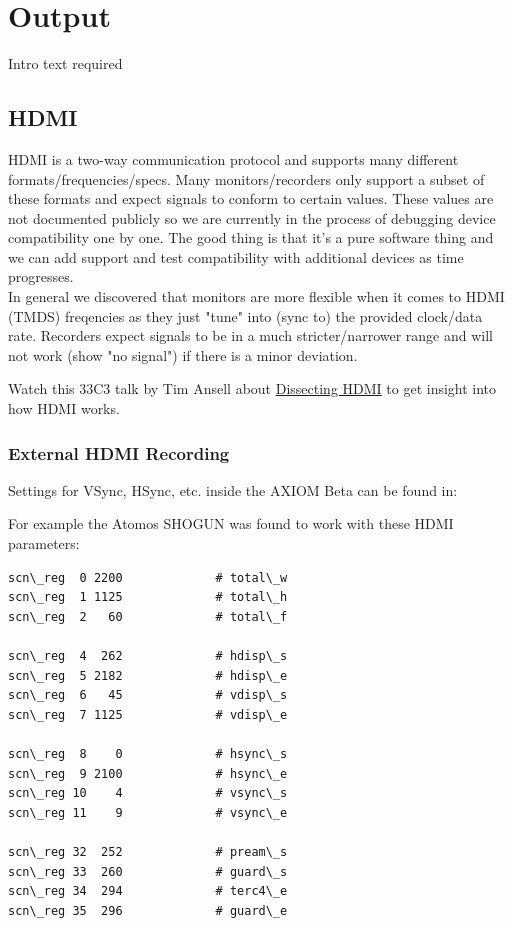 \section{Output}

Intro text required

\subsection{HDMI}

HDMI is a two-way communication protocol and supports many different formats/frequencies/specs. Many monitors/recorders only support a subset of these formats and expect signals to conform to certain values. These values are not documented publicly so we are currently in the process of debugging device compatibility one by one. The good thing is that it's a pure software thing and we can add support and test compatibility with additional devices as time progresses.\\

In general we discovered that monitors are more flexible when it comes to HDMI (TMDS) freqencies as they just "tune" into (sync to) the provided clock/data rate. Recorders expect signals to be in a much stricter/narrower range and will not work (show "no signal") if there is a minor deviation. 

Watch this 33C3 talk by Tim Ansell about \href{https://media.ccc.de/v/33c3-8057-dissecting_hdmi}{Dissecting HDMI} to get insight into how HDMI works.

\subsubsection{External HDMI Recording}

Settings for VSync, HSync, etc. inside the AXIOM Beta can be found in: 


For example the Atomos SHOGUN was found to work with these HDMI parameters:  

\begin{lstlisting}[breaklines=true, breakatwhitespace=true]
scn\_reg  0 2200             # total\_w
scn\_reg  1 1125             # total\_h
scn\_reg  2   60             # total\_f

scn\_reg  4  262             # hdisp\_s
scn\_reg  5 2182             # hdisp\_e
scn\_reg  6   45             # vdisp\_s
scn\_reg  7 1125             # vdisp\_e

scn\_reg  8    0             # hsync\_s
scn\_reg  9 2100             # hsync\_e
scn\_reg 10    4             # vsync\_s
scn\_reg 11    9             # vsync\_e

scn\_reg 32  252             # pream\_s
scn\_reg 33  260             # guard\_s
scn\_reg 34  294             # terc4\_e
scn\_reg 35  296             # guard\_e
\end{lstlisting}

